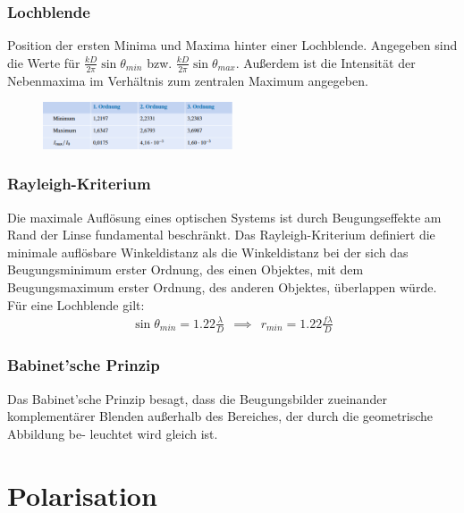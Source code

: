 \documentclass[twocolumn, unnumberedsubsub]{summery_3.1}
\begin{document}
\subsubsection{Lochblende}
Position der ersten Minima und Maxima hinter einer Lochblende. 
Angegeben sind die Werte für $\frac{k D}{2\pi} \sin \theta_{min}$ bzw. 
$\frac{k D}{2\pi} \sin \theta_{max}$. 
Au{\ss}erdem ist die Intensität der Nebenmaxima im Verhältnis zum zentralen
Maximum angegeben.
\begin{figure}[H]
    \centering
    \includegraphics[width=0.5\textwidth]{2.png}
\end{figure}

\subsubsection{Rayleigh-Kriterium}
Die maximale Auflösung eines optischen Systems ist durch Beugungseffekte am 
Rand der Linse fundamental beschränkt. 
Das Rayleigh-Kriterium definiert die minimale auflösbare Winkeldistanz
als die Winkeldistanz bei der 
sich das Beugungsminimum erster Ordnung, des einen Objektes, mit dem
Beugungsmaximum erster Ordnung, des anderen Objektes, überlappen würde. 
Für eine Lochblende gilt:
\begin{align*}
    \sin\theta_{min} =  1.22 \frac{\lambda}{D}
    \ \ \implies \ \ r_{min} =  1.22 \frac{f \lambda}{D}
\end{align*}

\subsubsection{Babinet'sche Prinzip}
Das Babinet'sche Prinzip besagt, dass die Beugungsbilder zueinander komplementärer
Blenden außerhalb des Bereiches, der durch die geometrische Abbildung be-
leuchtet wird gleich ist.

\section{Polarisation}
\end{document}
